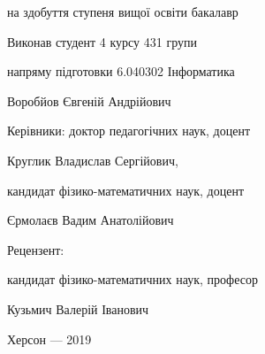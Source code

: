 \thispagestyle{empty}

{

на здобуття ступеня вищої освіти бакалавр

}

\vfill

\hfill\begin{minipage}[t]{0.65\textwidth}
Виконав студент 4 курсу 431 групи 

напряму підготовки 6.040302 Інформатика

Воробйов Євгеній Андрійович

Керівники: доктор педагогічних наук, доцент

Круглик Владислав Сергійович,

кандидат фізико-математичних наук, доцент

Єрмолаєв Вадим Анатолійович 

Рецензент: 

кандидат фізико-математичних наук, професор

Кузьмич Валерій Іванович


\end{minipage}

\vfill

{\centering
Херсон --- 2019

}